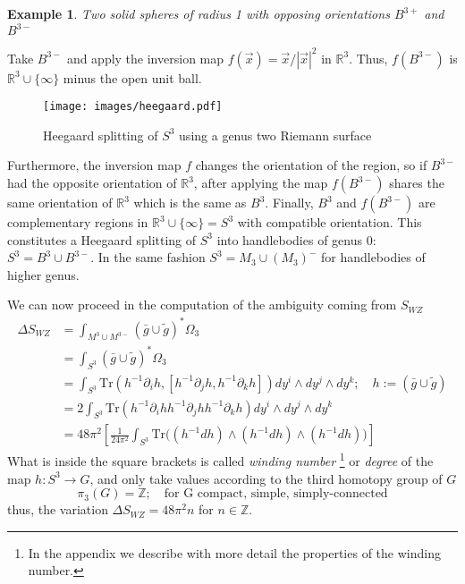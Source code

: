 \documentclass[a4paper,12pt]{article}
\newtheorem{exm}{Example}
\numberwithin{equation}{section}
\numberwithin{thm}{section}
\numberwithin{exm}{section}
\newcommand{\p}{\partial}
\newcommand{\tr}{\mathrm{Tr}}
\newcommand{\wt}{\widetilde}
\newcommand{\mo}{^{-1}}
\newcommand{\Z}{{\mathbb Z}}
\newcommand{\R}{{\mathbb R}}
\newcommand{\we}{{\wedge}}
\newcommand{\<}{{\langle}}
\renewcommand{\>}{{\rangle}}
\newcommand{\D}{{\Delta}}
\newcommand{\Om}{{\Omega}}
\begin{document}
\begin{exm} Two solid spheres of radius 1 with opposing orientations $B^{3+}$ and $B^{3-}$ \end{exm}
Take $B^{3-}$ and apply the inversion map $f(\vec x) = \vec x / |\vec x|^2$ in $\R^3$. Thus, $f(B^{3-})$ is $\R^3\cup\{\infty\}$ minus the open unit ball.
	\begin{figure}[ht]
  	\centering
  	\texttt{[image: images/heegaard.pdf]}
  	\caption{Heegaard splitting of $S^3$ using a genus two Riemann surface}
  	\label{heegaard}
	\end{figure}
Furthermore, the inversion map $f$ changes the orientation of the region, so if $B^{3-}$ had the opposite orientation of $\R^3$, after applying the map $f(B^{3-})$ shares the same orientation of $\R^3$ which is the same as $B^3$. Finally, $B^3$ and $f(B^{3-})$ are complementary regions in $\R^3\cup\{\infty\} = S^3$ with compatible orientation. This constitutes a Heegaard splitting of $S^3$ into handlebodies of genus 0: $S^3 = B^3 \cup B^{3-}$. In the same fashion $S^3 = M_3 \cup (M_3)^{-}$ for handlebodies of higher genus.

We can now proceed in the computation of the ambiguity coming from $S_{WZ}$
	\begin{align}
	\D S_{WZ} & = \int_{M^3 \cup M^{3-}} (\bar g \cup \wt g)^* \Om_3 \nonumber \\
	& = \int_{S^3} (\bar g \cup \wt g)^* \Om_3 \nonumber \\
	& = \int_{S^3} \tr(h\mo \p_i h,[h\mo \p_j h, h\mo \p_k h]) dy^i\we dy^j \we dy^k;\quad h := (\bar g \cup \wt g) \nonumber \\
	& = 2 \int_{S^3} \tr(h\mo \p_i h h\mo \p_j h h\mo \p_k h) dy^i\we dy^j \we dy^k \nonumber \\
	& = 48\pi^2 \left[ \frac{1}{24\pi^2} \int_{S^3} \tr\Big( (h\mo d h) \we (h\mo d h) \we (h\mo d h) \Big) \right]
	\end{align}
What is inside the square brackets is called {\it winding number}%
\footnote{In the appendix we describe with more detail the properties of the winding number.}
or {\it degree} of the map $h:S^3\rightarrow G$, and only take values according to the third homotopy group of $G$
	\begin{equation}
	\pi_3(G) = \Z ; \quad\text{for G compact, simple, simply-connected}
	\end{equation}
thus, the variation $\D S_{WZ} = 48 \pi^2 n$ for $n\in\Z$.
\end{document}
